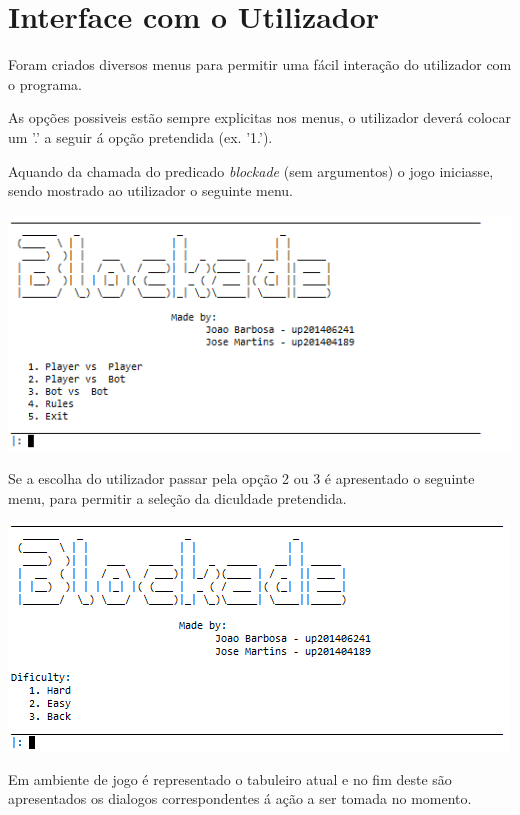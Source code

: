 \documentclass[a4paper]{article}
\begin{document}
\newpage
\section{Interface com o Utilizador}


Foram criados diversos menus para permitir uma fácil interação do utilizador com o programa.
\par As opções possiveis estão sempre explicitas nos menus, o utilizador deverá colocar um '.' a seguir á opção pretendida  (ex. '1.').
\par Aquando da chamada do predicado \textit{blockade} (sem argumentos) o jogo iniciasse, sendo mostrado ao utilizador o seguinte menu.

\begin{center}
	\includegraphics[scale = 0.7]{fig5.png}
\end{center}

Se a escolha do utilizador passar pela opção 2 ou 3 é apresentado o seguinte menu, para permitir a seleção da diculdade pretendida.

\begin{center}
	\includegraphics[scale = 0.7]{fig6.png}
\end{center}

Em ambiente de jogo é representado o tabuleiro atual e no fim deste são apresentados os dialogos correspondentes á ação a ser tomada no momento.
\end{document}
